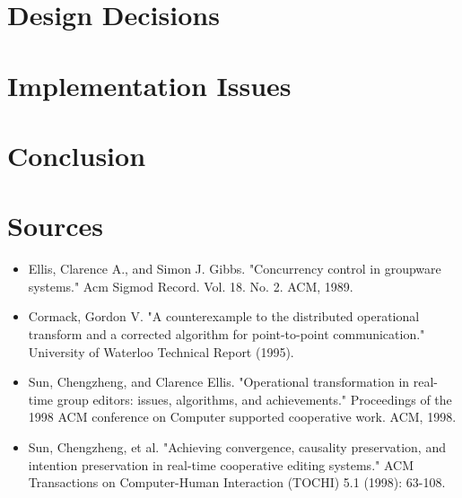 \documentclass{article}
\begin{document}
\section{Design Decisions}

\section{Implementation Issues}

\section{Conclusion}

\section{Sources}
\begin{itemize}
  \item Ellis, Clarence A., and Simon J. Gibbs. "Concurrency control in groupware systems." Acm Sigmod Record. Vol. 18. No. 2. ACM, 1989.
  \item Cormack, Gordon V. "A counterexample to the distributed operational transform and a corrected algorithm for point-to-point communication." University of Waterloo Technical Report (1995).
  \item Sun, Chengzheng, and Clarence Ellis. "Operational transformation in real-time group editors: issues, algorithms, and achievements." Proceedings of the 1998 ACM conference on Computer supported cooperative work. ACM, 1998.
  \item Sun, Chengzheng, et al. "Achieving convergence, causality preservation, and intention preservation in real-time cooperative editing systems." ACM Transactions on Computer-Human Interaction (TOCHI) 5.1 (1998): 63-108.
\end{itemize}
\end{document}

